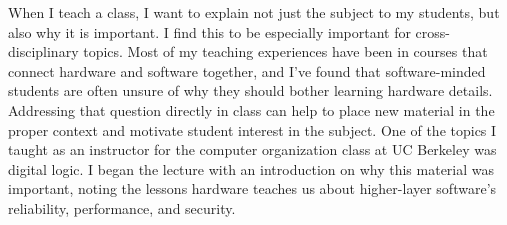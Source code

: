 \documentclass[12pt]{article} %
\begin{document}
When I teach a class, I want to explain not just the subject to my students,
but also why it is important. I find this to be especially important for
cross-disciplinary topics. Most of my teaching experiences have been in courses
that connect hardware and software together, and I've found that
software-minded students are often unsure of why they should bother learning
hardware details. Addressing that question directly in class can help to place
new material in the proper context and motivate student interest in the
subject. One of the topics I taught as an instructor for the computer
organization class at UC Berkeley was digital logic. I began the lecture with
an introduction on why this material was important, noting the lessons hardware
teaches us about higher-layer software's reliability, performance, and
security.
\end{document}
